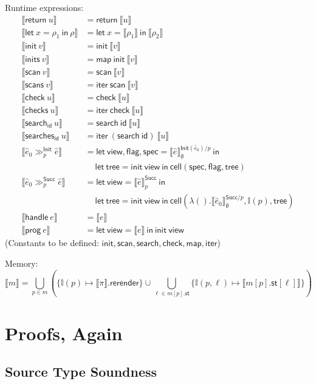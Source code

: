 \documentclass{article}
\newcommand{\mf}[1]{\mathsf{#1}}
\newcommand{\llrr}[1]{\llbracket #1 \rrbracket}
\newcommand{\I}{\mathbb{I}}
\newcommand{\elet}[3]{\mf{let}\ #1 = #2\ \mf{in}\ #3}
\newcommand{\eret}[1]{\mf{return}\ #1}
\newcommand{\esearch}[2]{\mf{search}_\mf{#1}\ #2}
\newcommand{\esearches}[2]{\mf{searches}_\mf{#1}\ #2}
\newcommand{\ehdl}[1]{\mf{handle}\ #1}
\newcommand{\eprog}[1]{\mf{prog}\ #1}
\newcommand{\einit}[1]{\mf{init}\ #1}
\newcommand{\einits}[1]{\mf{inits}\ #1}
\newcommand{\escan}[1]{\mf{scan}\ #1}
\newcommand{\escans}[1]{\mf{scans}\ #1}
\newcommand{\echk}[1]{\mf{check}\ #1}
\newcommand{\echks}[1]{\mf{checks}\ #1}
\begin{document}
Runtime expressions:
\begin{align*}
\llrr{\eret{u}} &= \eret{\llrr{u}}\\
\llrr{\elet{x}{\rho_1}{\rho}} &= 
\elet{x}{\llrr{\rho_1}}{\llrr{\rho_2}}\\
\llrr{\einit{v}} &= \mf{init}\ \llrr{v}\\
\llrr{\einits{v}} &= \mf{map}\ \mf{init}\ \llrr{v}\\
\llrr{\escan{v}} &= \mf{scan}\ \llrr{v}\\
\llrr{\escans{v}} &= \mf{iter}\ \mf{scan}\ \llrr{v}\\
\llrr{\echk{u}} &= \mf{check}\ \llrr{u}\\
\llrr{\echks{u}} &= \mf{iter}\ \mf{check}\ \llrr{u}\\
\llrr{\esearch{id}{u}} &= \mf{search}\ \mf{id}\ \llrr{u}\\
\llrr{\esearches{id}{u}} &= \mf{iter}\ (\mf{search}\ \mf{id})\ \llrr{u}\\
\llrr{\hat{e}_0 \gg^\mf{Init}_p \hat{e}}
&= \elet{\mf{view, flag, spec}}{\llrr{\hat{e}}^{\mf{Init}(\hat{e}_0)/p}_\emptyset}{\\
  &\quad\ \elet{\mf{tree}}{\mf{init}\ \mf{view}}{
    \mf{cell(spec, flag, tree)}
  }
}\\
\llrr{\hat{e}_0 \gg^\mf{Succ}_p \hat{e}}
&= \elet{\mf{view}}{\llrr{\hat{e}}^{\mf{Succ}}_p}{\\
  &\quad\ \elet{\mf{tree}}{\mf{init}\ \mf{view}}{
    \mf{cell}(
      \lambda().\llrr{\hat{e}_0}^{\mf{Succ}/p}_\emptyset,
      \I(p),
      \mf{tree}
    )
  }
}\\
\llrr{\ehdl{e}} &= \llrr{e}\\
\llrr{\eprog{e}} &= \elet{\mf{view}}{\llrr{e}}{\einit{\mf{view}}}
\end{align*}
(Constants to be defined: 
$\mf{init}, \mf{scan}, \mf{search}, \mf{check}, \mf{map}, \mf{iter}$)

Memory:
$$
\llrr{m} = \bigcup_{p \in m} \left(
  \{\I(p) \mapsto \llrr{\pi}.\mf{rerender}\}
  \cup \bigcup_{\ell \in m[p].\mf{st}} \{
    \I(p, \ell) \mapsto \llrr{m[p].\mf{st}[\ell]}
  \}
\right)
$$

\section{Proofs, Again}

\subsection{Source Type Soundness}
\end{document}
